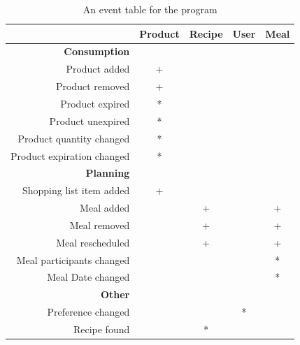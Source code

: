\begin{table}[H]\centering
    \begin{tabular}{|r|c|c|c|c|}
        \hline
        ~                                      & Product & Recipe & User & Meal\\ \hline
        \textbf{Consumption}                   & ~       & ~      & ~    & ~   \\ 
		Product added                          & +       & ~      & ~    & ~   \\ 
        Product removed                        & +       & ~      & ~    & ~   \\ 
        Product expired                        & *       & ~      & ~    & ~   \\ 
        Product unexpired                      & *       & ~      & ~    & ~   \\ 
        Product quantity changed               & *       & ~      & ~    & ~   \\ 
        Product expiration changed             & *       & ~      & ~    & ~   \\ 
        \textbf{Planning}                      & ~       & ~      & ~    & ~   \\ 
        Shopping list item added               & +       & ~      & ~    & ~   \\ 
        Meal added                             & ~       & +      & ~    & +   \\ 
        Meal removed                           & ~       & +      & ~    & +   \\ 
        Meal rescheduled                       & ~       & +      & ~    & +   \\ 
        Meal participants changed              & ~       & ~      & ~    & *   \\ 
        Meal Date changed                      & ~       & ~      & ~    & *   \\ 
        \textbf{Other}                         & ~       & ~      & ~    & ~   \\ 
        Preference changed                     & ~       & ~      & *    & ~   \\ 
		Recipe found                           & ~       & *      & ~    & ~   \\ 
		\hline    
    \end{tabular}
    \caption{An event table for the program} 
    \label{tab:EventTable}
\end{table}